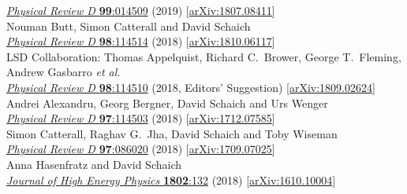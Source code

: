 \begin{spacelist}
\begin{revnumerate}
      \href{http://dx.doi.org/10.1103/PhysRevD.99.014509}{\textit{Physical Review D} \textbf{99}:014509} (2019) [\href{http://arxiv.org/abs/1807.08411}{arXiv:1807.08411}]
    \pagebreakitem
       \\
      Nouman Butt, Simon Catterall and David Schaich \\
      \href{http://dx.doi.org/10.1103/PhysRevD.98.114514}{\textit{Physical Review D} \textbf{98}:114514} (2018) [\href{http://arxiv.org/abs/1810.06117}{arXiv:1810.06117}]
    \pagebreakitem
       \\
      LSD Collaboration: Thomas Appelquist, Richard C.~Brower, George T.~Fleming, Andrew Gasbarro \textit{et al.} \\ %
      \href{http://dx.doi.org/10.1103/PhysRevD.98.114510}{\textit{Physical Review D} \textbf{98}:114510} (2018, Editors' Suggestion) [\href{http://arxiv.org/abs/1809.02624}{arXiv:1809.02624}]
    \pagebreakitem
       \\
      Andrei Alexandru, Georg Bergner, David Schaich and Urs Wenger \\
      \href{http://dx.doi.org/10.1103/PhysRevD.97.114503}{\textit{Physical Review D} \textbf{97}:114503} (2018) [\href{http://arxiv.org/abs/1712.07585}{arXiv:1712.07585}]
    \pagebreakitem
       \\
      Simon Catterall, Raghav G.~Jha, David Schaich and Toby Wiseman \\
      \href{http://dx.doi.org/10.1103/PhysRevD.97.086020}{\textit{Physical Review D} \textbf{97}:086020} (2018) [\href{http://arxiv.org/abs/1709.07025}{arXiv:1709.07025}]
    \pagebreakitem
       \\
      Anna Hasenfratz and David Schaich \\
      \href{http://dx.doi.org/10.1007/JHEP02(2018)132}{\textit{Journal of High Energy Physics} \textbf{1802}:132} (2018) [\href{http://arxiv.org/abs/1610.10004}{arXiv:1610.10004}]
    \pagebreakitem
       \\

\end{revnumerate}
\end{spacelist}

